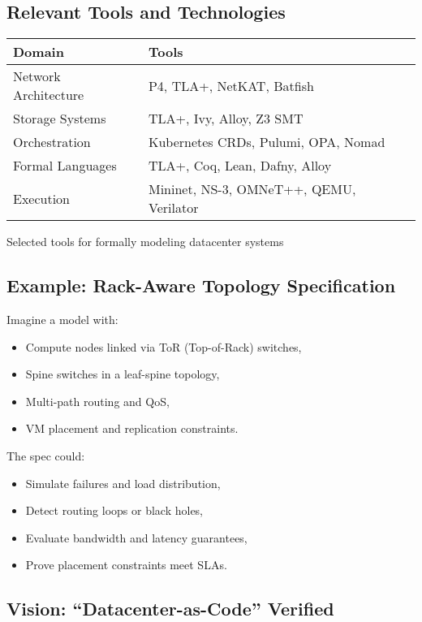 \documentclass[../../../OAE-SPEC-MAIN.tex]{subfiles}
\begin{document}
\subsection*{Relevant Tools and Technologies}

\begin{marginfigure}
\footnotesize
\begin{tabularx}{\linewidth}{@{}lX@{}}
\toprule
\textbf{Domain} & \textbf{Tools} \\
\midrule
Network Architecture & P4, TLA+, NetKAT, Batfish \\
Storage Systems & TLA+, Ivy, Alloy, Z3 SMT \\
Orchestration & Kubernetes CRDs, Pulumi, OPA, Nomad \\
Formal Languages & TLA+, Coq, Lean, Dafny, Alloy \\
Execution & Mininet, NS-3, OMNeT++, QEMU, Verilator \\
\bottomrule
\end{tabularx}
\caption{Selected tools for formally modeling datacenter systems}
\end{marginfigure}

\subsection*{Example: Rack-Aware Topology Specification}

Imagine a model with:
\begin{itemize}
  \item Compute nodes linked via ToR (Top-of-Rack) switches,
  \item Spine switches in a leaf-spine topology,
  \item Multi-path routing and QoS,
  \item VM placement and replication constraints.
\end{itemize}

The spec could:
\begin{itemize}
  \item Simulate failures and load distribution,
  \item Detect routing loops or black holes,
  \item Evaluate bandwidth and latency guarantees,
  \item Prove placement constraints meet SLAs.
\end{itemize}

\subsection*{Vision: ``Datacenter-as-Code'' Verified}
\end{document}

